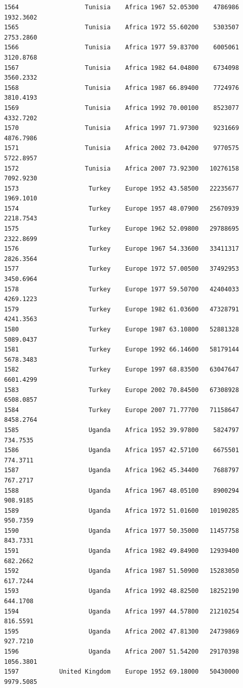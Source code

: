 \documentclass[
  letterpaper,
  DIV=11,
  numbers=noendperiod]{scrreprt}
\begin{document}
\begin{verbatim}
1564                  Tunisia    Africa 1967 52.05300    4786986   1932.3602
1565                  Tunisia    Africa 1972 55.60200    5303507   2753.2860
1566                  Tunisia    Africa 1977 59.83700    6005061   3120.8768
1567                  Tunisia    Africa 1982 64.04800    6734098   3560.2332
1568                  Tunisia    Africa 1987 66.89400    7724976   3810.4193
1569                  Tunisia    Africa 1992 70.00100    8523077   4332.7202
1570                  Tunisia    Africa 1997 71.97300    9231669   4876.7986
1571                  Tunisia    Africa 2002 73.04200    9770575   5722.8957
1572                  Tunisia    Africa 2007 73.92300   10276158   7092.9230
1573                   Turkey    Europe 1952 43.58500   22235677   1969.1010
1574                   Turkey    Europe 1957 48.07900   25670939   2218.7543
1575                   Turkey    Europe 1962 52.09800   29788695   2322.8699
1576                   Turkey    Europe 1967 54.33600   33411317   2826.3564
1577                   Turkey    Europe 1972 57.00500   37492953   3450.6964
1578                   Turkey    Europe 1977 59.50700   42404033   4269.1223
1579                   Turkey    Europe 1982 61.03600   47328791   4241.3563
1580                   Turkey    Europe 1987 63.10800   52881328   5089.0437
1581                   Turkey    Europe 1992 66.14600   58179144   5678.3483
1582                   Turkey    Europe 1997 68.83500   63047647   6601.4299
1583                   Turkey    Europe 2002 70.84500   67308928   6508.0857
1584                   Turkey    Europe 2007 71.77700   71158647   8458.2764
1585                   Uganda    Africa 1952 39.97800    5824797    734.7535
1586                   Uganda    Africa 1957 42.57100    6675501    774.3711
1587                   Uganda    Africa 1962 45.34400    7688797    767.2717
1588                   Uganda    Africa 1967 48.05100    8900294    908.9185
1589                   Uganda    Africa 1972 51.01600   10190285    950.7359
1590                   Uganda    Africa 1977 50.35000   11457758    843.7331
1591                   Uganda    Africa 1982 49.84900   12939400    682.2662
1592                   Uganda    Africa 1987 51.50900   15283050    617.7244
1593                   Uganda    Africa 1992 48.82500   18252190    644.1708
1594                   Uganda    Africa 1997 44.57800   21210254    816.5591
1595                   Uganda    Africa 2002 47.81300   24739869    927.7210
1596                   Uganda    Africa 2007 51.54200   29170398   1056.3801
1597           United Kingdom    Europe 1952 69.18000   50430000   9979.5085

\end{verbatim}
\end{document}
